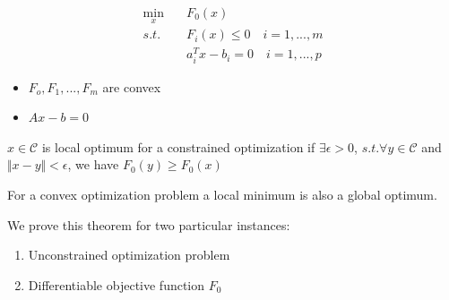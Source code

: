 


\begin{align*}
\min_x\quad & F_0(x) \\
s.t.\quad & F_i(x) \leq 0 \quad i = 1,...,m\\
& a_i^Tx - b_i = 0\quad i = 1,...,p
\end{align*}

\begin{itemize}
	\item $F_o, F_1,...,F_m$ are convex
	
	\item $Ax - b = 0$
\end{itemize}

\begin{definition}
	$x\in \mathcal{C}$ is local optimum for a constrained optimization if $\exists \epsilon > 0$, $s.t.\forall y\in \mathcal{C}$ and $\Vert x-y\Vert < \epsilon$, we have $F_0(y) \geq F_0(x)$
\end{definition}

\begin{theorem}
	For a convex optimization problem a local minimum is also a global optimum. 
\end{theorem}


We prove this theorem for two particular instances:
\begin{enumerate}
	\item Unconstrained optimization problem
	
	\item Differentiable objective function $F_0$
\end{enumerate}

